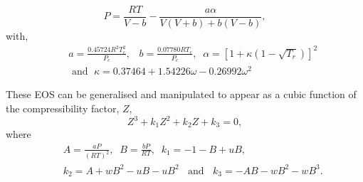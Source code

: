 \documentclass[12pts,a4paper,amsmath,amssymb,floatfix]{article}%
\newcommand{\frc}{\displaystyle\frac}
\begin{document}
\begin{enumerate}[i)]
\begin{enumerate}[a)]
\begin{enumerate}[c.1)]
                           \begin{equation}
                               P = \frc{R T}{V-b} - \frc{a\alpha}{V\left(V+b\right)+b\left(V-b\right)},\label{Mod02_PREOS}
                           \end{equation}
                           with,
                          \begin{eqnarray}
                              && a = \frc{0.45724 R^{2}T_{c}^{2}}{P_{c}},\;\;\;b = \frc{0.07780 R T_{c} }{P_{c}},\;\;\alpha = \left[1 + \kappa\left(1-\sqrt{T_{r}}\right)\right]^{2}  \nonumber \\
                              &&\text{ and }\; \kappa = 0.37464 + 1.54226\omega - 0.26992\omega^{2} \nonumber
                          \end{eqnarray}                
%
                   \end{enumerate}
                   These EOS can be generalised and manipulated to appear as a cubic function of the compressibility factor, $Z$,
                   \begin{equation}
                      Z^{3} + k_{1} Z^{2} +k_{2} Z + k_{3} = 0,\label{Mod02_GeneralEOS}
                   \end{equation}
                   where
                   \begin{eqnarray}
                     && A = \frc{aP}{\left(RT\right)^{2}},\;\; B = \frc{bP}{RT},\;\; k_{1} = -1 -B + uB, \nonumber \\
                     && k_{2} = A + w B^{2} - uB -uB^{2}\;\;\text{ and }\;\; k_{3} = - AB -w B^{2} -w B^{3}.\nonumber
                   \end{eqnarray}


\end{enumerate}
\end{enumerate}
\end{document}
